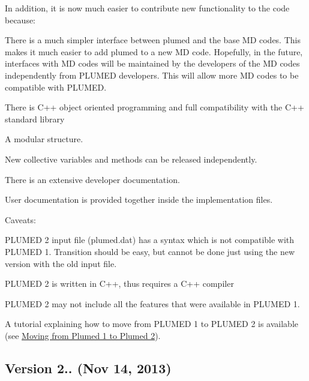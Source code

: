 In addition, it is now much easier to contribute new functionality to the code because\+:
\begin{DoxyItemize}
\item There is a much simpler interface between plumed and the base M\+D codes. This makes it much easier to add plumed to a new M\+D code. Hopefully, in the future, interfaces with M\+D codes will be maintained by the developers of the M\+D codes independently from P\+L\+U\+M\+E\+D developers. This will allow more M\+D codes to be compatible with P\+L\+U\+M\+E\+D.
\item There is C++ object oriented programming and full compatibility with the C++ standard library
\item A modular structure.
\item New collective variables and methods can be released independently.
\item There is an extensive developer documentation.
\item User documentation is provided together inside the implementation files.
\end{DoxyItemize}

Caveats\+:
\begin{DoxyItemize}
\item P\+L\+U\+M\+E\+D 2 input file (plumed.\+dat) has a syntax which is not compatible with P\+L\+U\+M\+E\+D 1. Transition should be easy, but cannot be done just using the new version with the old input file.
\item P\+L\+U\+M\+E\+D 2 is written in C++, thus requires a C++ compiler
\item P\+L\+U\+M\+E\+D 2 may not include all the features that were available in P\+L\+U\+M\+E\+D 1.
\end{DoxyItemize}

A tutorial explaining how to move from P\+L\+U\+M\+E\+D 1 to P\+L\+U\+M\+E\+D 2 is available (see \hyperlink{moving}{Moving from Plumed 1 to Plumed 2}).

\subsection*{Version 2.. (Nov 14, 2013) }

